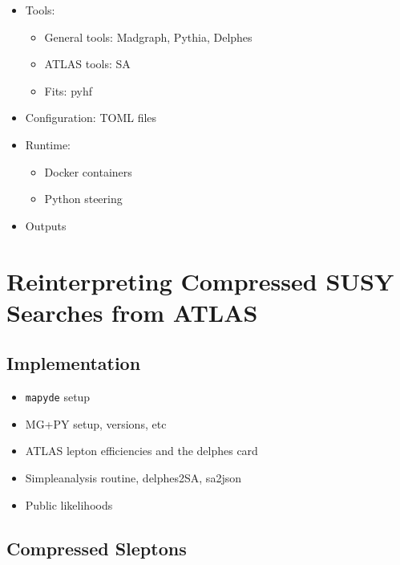 \documentclass{article}
\begin{document}
\begin{itemize}
\item Tools:
  \begin{itemize}
  \item General tools: Madgraph, Pythia, Delphes
  \item ATLAS tools: SA
  \item Fits: pyhf
  \end{itemize}
\item Configuration: TOML files
\item Runtime:
  \begin{itemize}
  \item Docker containers
  \item Python steering
  \end{itemize}
\item Outputs
\end{itemize}

\section{Reinterpreting Compressed SUSY Searches from ATLAS}
\label{sec:reinterp}

\subsection{Implementation}
\label{sec:reinterp-imp}

\begin{itemize}
\item \texttt{mapyde} setup
\item MG+PY setup, versions, etc
\item ATLAS lepton efficiencies and the delphes card
\item Simpleanalysis routine, delphes2SA, sa2json
\item Public likelihoods
\end{itemize}

\subsection{Compressed Sleptons}
\label{reinterp-slep}
\end{document}
